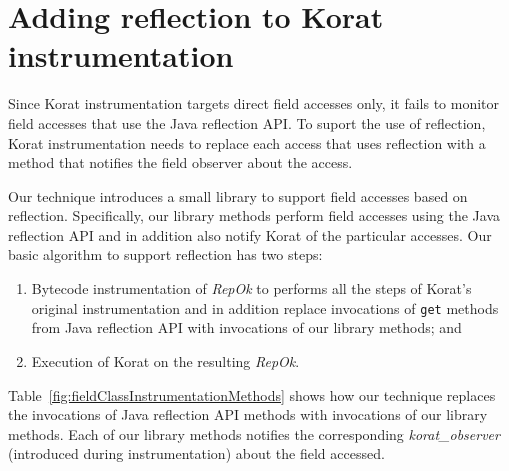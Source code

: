 \section{Adding reflection to Korat instrumentation}
\label{sec:adding-reflection-to-instrumentation}
Since Korat instrumentation targets direct field accesses only, it
fails to monitor field accesses that use the Java reflection API. To
suport the use of reflection, Korat instrumentation needs to replace
each access that uses reflection with a method that notifies the
field observer about the access.

Our technique introduces a small library to support field accesses
based on reflection.  Specifically, our library methods perform field
accesses using the Java reflection API and in addition also notify
Korat of the particular accesses.  Our basic algorithm to support
reflection has two steps:
\begin{enumerate}
\item Bytecode instrumentation of \emph{RepOk} to performs all the steps of
  Korat's original instrumentation and in addition replace invocations
  of \texttt{get} methods from Java reflection API with invocations of
  our library methods; and
\item Execution of Korat on the resulting \emph{RepOk}.
\end{enumerate}

Table~\ref{fig:fieldClassInstrumentationMethods} shows how our
technique replaces the invocations of Java reflection API methods with
invocations of our library methods.  Each of our library methods
notifies the corresponding \emph{korat\_observer} (introduced during
instrumentation) about the field accessed.


